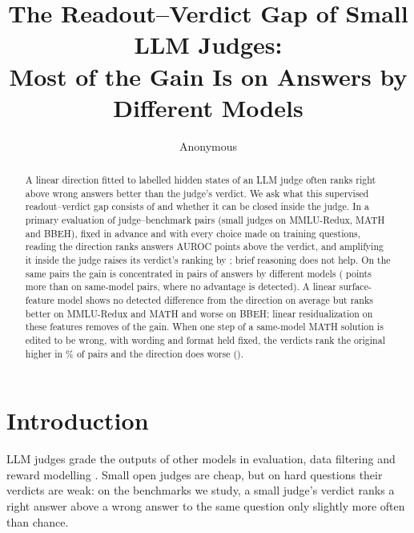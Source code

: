 \documentclass[11pt]{article}
\title{The Readout--Verdict Gap of Small LLM Judges:\\Most of the Gain Is on Answers by Different Models}
\author{Anonymous}
\begin{document}
\maketitle

\begin{abstract}
A linear direction fitted to labelled hidden states of an LLM judge often ranks right above wrong answers better than the judge's verdict. We ask what this supervised readout--verdict gap consists of and whether it can be closed inside the judge. In a primary evaluation of  judge--benchmark pairs (small judges on MMLU-Redux, MATH and BBEH), fixed in advance and with every choice made on training questions, reading the direction ranks answers  AUROC points above the verdict, and amplifying it inside the judge raises its verdict's ranking by ; brief reasoning does not help. On the same pairs the gain is concentrated in pairs of answers by different models ( points more than on same-model pairs, where no advantage is detected). A linear surface-feature model shows no detected difference from the direction on average but ranks better on MMLU-Redux and MATH and worse on BBEH; linear residualization on these features removes  of the gain. When one step of a same-model MATH solution is edited to be wrong, with wording and format held fixed, the verdicts rank the original higher in \% of pairs and the direction does worse ().
\end{abstract}

\section{Introduction}

LLM judges grade the outputs of other models in evaluation, data filtering and reward modelling \citep{zheng2023judging}. Small open judges are cheap, but on hard questions their verdicts are weak: on the benchmarks we study, a small judge's verdict ranks a right answer above a wrong answer to the same question only slightly more often than chance.
\end{document}
